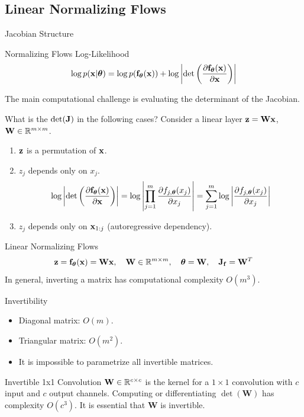 \documentclass{beamer}
\begin{document}
\subsection{Linear Normalizing Flows}
\begin{frame}{Jacobian Structure}
	\begin{block}{Normalizing Flows Log-Likelihood}
		\[
			\log p(\mathbf{x}|\boldsymbol{\theta}) = \log p(\mathbf{f}_{\boldsymbol{\theta}}(\mathbf{x})) + \log \left|\det \left( \frac{\partial \mathbf{f}_{\boldsymbol{\theta}}(\mathbf{x})}{\partial \mathbf{x}} \right) \right|
		\]
	\end{block}
	The main computational challenge is evaluating the determinant of the Jacobian.
	\begin{block}{What is the $\det(\mathbf{J})$ in the following cases?}
		Consider a linear layer $\mathbf{z} = \mathbf{W} \mathbf{x}$, $\mathbf{W} \in \mathbb{R}^{m \times m}$.
		\begin{enumerate}
			\item $\mathbf{z}$ is a permutation of $\mathbf{x}$.
			\item $z_j$ depends only on $x_j$. 
			\vspace{-0.3cm}
			\[
				\log \left|\det \left( \frac{\partial \mathbf{f}_{\boldsymbol{\theta}}(\mathbf{x})}{\partial \mathbf{x}} \right) \right| = \log \left| \prod_{j=1}^m \frac{\partial f_{j, \boldsymbol{\theta}}(x_j)}{\partial x_j} \right| = \sum_{j=1}^m \log \left|  \frac{\partial f_{j, \boldsymbol{\theta}}(x_j)}{\partial x_j} \right|
			\]
			\item $z_j$ depends only on $\mathbf{x}_{1:j}$ (autoregressive dependency).
		\end{enumerate}
	\end{block}
\end{frame}
\begin{frame}{Linear Normalizing Flows}
	\[
		\mathbf{z} = \mathbf{f}_{\boldsymbol{\theta}}(\mathbf{x}) = \mathbf{W} \mathbf{x}, \quad \mathbf{W} \in \mathbb{R}^{m \times m}, \quad \boldsymbol{\theta} = \mathbf{W}, \quad \mathbf{J}_{\mathbf{f}} = \mathbf{W}^T
	\]
	In general, inverting a matrix has computational complexity $O(m^3)$.
	\begin{block}{Invertibility}
		\begin{itemize}
			\item Diagonal matrix: $O(m)$.
			\item Triangular matrix: $O(m^2)$.
			\item It is impossible to parametrize all invertible matrices.
		\end{itemize}
	\end{block}
	\begin{block}{Invertible 1x1 Convolution}
		$\mathbf{W} \in \mathbb{R}^{c \times c}$ is the kernel for a $1 \times 1$ convolution with $c$ input and $c$ output channels. 
		Computing or differentiating $\det (\mathbf{W})$ has complexity $O(c^3)$.
		It is essential that $\mathbf{W}$ is invertible.
	\end{block}
	
\end{frame}
\end{document}

